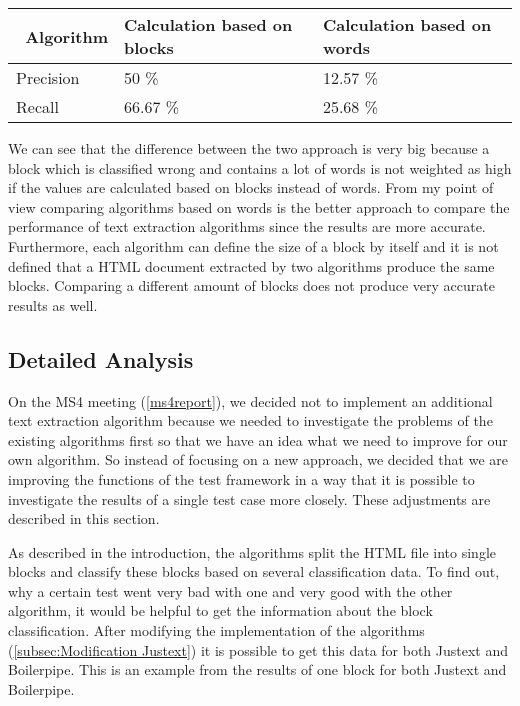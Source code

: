 \begin{tabular}{| p{3cm} | p{5cm} | p{5cm} | }
    \hline
    \ \textbf{Algorithm}  & \textbf{Calculation based on blocks}  & \textbf{Calculation based on words} 				\\ \hline
    Precision     & 50 \%    	&  12.57 \%	\\ \hline
    Recall & 66.67 \%    	&  25.68 \%	\\ \hline
\end{tabular}

We can see that the difference between the two approach is very big because a block which is classified wrong and contains a lot of words is not weighted as high if the values are calculated based on blocks instead of words. 
From my point of view comparing algorithms based on words is the better approach to compare the performance of text extraction algorithms since the results are more accurate. Furthermore, each algorithm can define the size of a block by itself and it is not defined that a HTML document extracted by two algorithms produce the same blocks. Comparing a different amount of blocks does not produce very accurate results as well.  

\subsection{Detailed Analysis}
\label{subsec:Detailed Analysis}


On the MS4 meeting (\ref{ms4report}), we decided not to implement an additional text extraction algorithm because we needed to investigate the problems of the existing algorithms first so that we have an idea what we need to improve for our own algorithm. So instead of focusing on a new approach, we decided that we are improving the functions of the test framework in a way that it is possible to investigate the results of a single test case more closely. These adjustments are described in this section.

As described in the introduction, the algorithms split the HTML file into single blocks and classify these blocks based on several classification data. To find out, why a certain test went very bad with one and very good with the other algorithm, it would be helpful to get the information about the block classification. After modifying the implementation of the algorithms (\ref{subsec:Modification Justext}) it is possible to get this data for both Justext and Boilerpipe. This is an example from the results of one block for both Justext and Boilerpipe.


